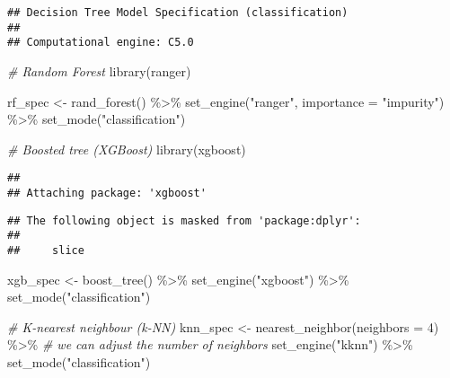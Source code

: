 \documentclass[
]{article}
\newenvironment{Shaded}{\begin{snugshade}}{\end{snugshade}}
\newcommand{\AttributeTok}[1]{\textcolor[rgb]{0.77,0.63,0.00}{#1}}
\newcommand{\CommentTok}[1]{\textcolor[rgb]{0.56,0.35,0.01}{\textit{#1}}}
\newcommand{\DecValTok}[1]{\textcolor[rgb]{0.00,0.00,0.81}{#1}}
\newcommand{\FunctionTok}[1]{\textcolor[rgb]{0.00,0.00,0.00}{#1}}
\newcommand{\NormalTok}[1]{#1}
\newcommand{\OtherTok}[1]{\textcolor[rgb]{0.56,0.35,0.01}{#1}}
\newcommand{\SpecialCharTok}[1]{\textcolor[rgb]{0.00,0.00,0.00}{#1}}
\newcommand{\StringTok}[1]{\textcolor[rgb]{0.31,0.60,0.02}{#1}}
\begin{document}
\begin{verbatim}
## Decision Tree Model Specification (classification)
## 
## Computational engine: C5.0
\end{verbatim}

\begin{Shaded}
\begin{Highlighting}[]
\CommentTok{\# Random Forest}
\FunctionTok{library}\NormalTok{(ranger)}

\NormalTok{rf\_spec }\OtherTok{\textless{}{-}} 
  \FunctionTok{rand\_forest}\NormalTok{() }\SpecialCharTok{\%\textgreater{}\%} 
  \FunctionTok{set\_engine}\NormalTok{(}\StringTok{"ranger"}\NormalTok{, }\AttributeTok{importance =} \StringTok{"impurity"}\NormalTok{) }\SpecialCharTok{\%\textgreater{}\%} 
  \FunctionTok{set\_mode}\NormalTok{(}\StringTok{"classification"}\NormalTok{)}


\CommentTok{\# Boosted tree (XGBoost)}
\FunctionTok{library}\NormalTok{(xgboost)}
\end{Highlighting}
\end{Shaded}

\begin{verbatim}
## 
## Attaching package: 'xgboost'
\end{verbatim}

\begin{verbatim}
## The following object is masked from 'package:dplyr':
## 
##     slice
\end{verbatim}

\begin{Shaded}
\begin{Highlighting}[]
\NormalTok{xgb\_spec }\OtherTok{\textless{}{-}} 
  \FunctionTok{boost\_tree}\NormalTok{() }\SpecialCharTok{\%\textgreater{}\%} 
  \FunctionTok{set\_engine}\NormalTok{(}\StringTok{"xgboost"}\NormalTok{) }\SpecialCharTok{\%\textgreater{}\%} 
  \FunctionTok{set\_mode}\NormalTok{(}\StringTok{"classification"}\NormalTok{) }

\CommentTok{\# K{-}nearest neighbour (k{-}NN)}
\NormalTok{knn\_spec }\OtherTok{\textless{}{-}} 
  \FunctionTok{nearest\_neighbor}\NormalTok{(}\AttributeTok{neighbors =} \DecValTok{4}\NormalTok{) }\SpecialCharTok{\%\textgreater{}\%} \CommentTok{\# we can adjust the number of neighbors }
  \FunctionTok{set\_engine}\NormalTok{(}\StringTok{"kknn"}\NormalTok{) }\SpecialCharTok{\%\textgreater{}\%} 
  \FunctionTok{set\_mode}\NormalTok{(}\StringTok{"classification"}\NormalTok{)}
\end{Highlighting}
\end{Shaded}
\end{document}
